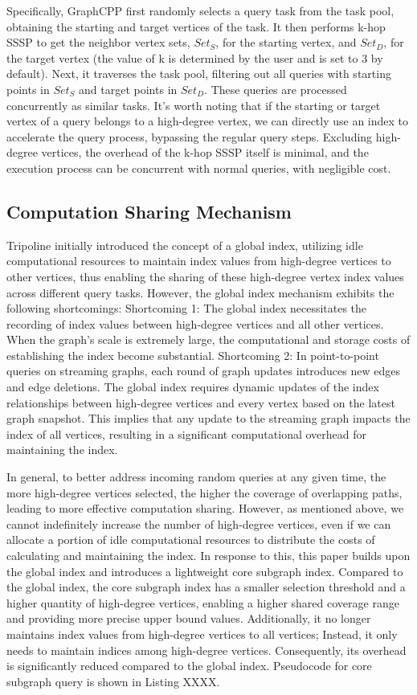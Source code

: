 \documentclass[lettersize,journal]{IEEEtran} %
\begin{document}
Specifically, GraphCPP first randomly selects a query task from the task pool, obtaining the starting and target vertices of the task. It then performs k-hop SSSP to get the neighbor vertex sets, $Set_S$, for the starting vertex, and $Set_D$, for the target vertex (the value of k is determined by the user and is set to 3 by default). Next, it traverses the task pool, filtering out all queries with starting points in $Set_S$ and target points in $Set_D$. These queries are processed concurrently as similar tasks. It's worth noting that if the starting or target vertex of a query belongs to a high-degree vertex, we can directly use an index to accelerate the query process, bypassing the regular query steps. Excluding high-degree vertices, the overhead of the k-hop SSSP itself is minimal, and the execution process can be concurrent with normal queries, with negligible cost.


\subsection{Computation Sharing Mechanism}
Tripoline initially introduced the concept of a global index, utilizing idle computational resources to maintain index values from high-degree vertices to other vertices, thus enabling the sharing of these high-degree vertex index values across different query tasks. However, the global index mechanism exhibits the following shortcomings:  Shortcoming 1: The global index necessitates the recording of index values between high-degree vertices and all other vertices. When the graph's scale is extremely large, the computational and storage costs of establishing the index become substantial. Shortcoming 2: In point-to-point queries on streaming graphs, each round of graph updates introduces new edges and edge deletions. The global index requires dynamic updates of the index relationships between high-degree vertices and every vertex based on the latest graph snapshot. This implies that any update to the streaming graph impacts the index of all vertices, resulting in a significant computational overhead for maintaining the index.

In general, to better address incoming random queries at any given time, the more high-degree vertices selected, the higher the coverage of overlapping paths, leading to more effective computation sharing. However, as mentioned above, we cannot indefinitely increase the number of high-degree vertices, even if we can allocate a portion of idle computational resources to distribute the costs of calculating and maintaining the index. In response to this, this paper builds upon the global index and introduces a lightweight core subgraph index. Compared to the global index, the core subgraph index has a smaller selection threshold and a higher quantity of high-degree vertices, enabling a higher shared coverage range and providing more precise upper bound values. Additionally, it no longer maintains index values from high-degree vertices to all vertices; Instead, it only needs to maintain indices among high-degree vertices. Consequently, its overhead is significantly reduced compared to the global index. Pseudocode for core subgraph query is shown in Listing XXXX.
\end{document}
